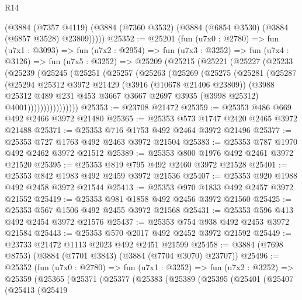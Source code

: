 \begin{lexlean}{R14}
\begin{coremodule}
      (@3884
        (@7357 @4119)
        (@3884 (@7360 @3532) (@3884 (@6854 @3530) (@3884 (@6857 @3528) @23809)))))
@25352 := @25201
    (fun (u7x0 : @2780) =>
    fun (u7x1 : @3093) =>
    fun (u7x2 : @2954) =>
    fun (u7x3 : @3252) =>
    fun (u7x4 : @3126) =>
    fun (u7x5 : @3252) =>
    @25209
      (@25215
        (@25221
          (@25227
            (@25233
              (@25239
                (@25245
                  (@25251
                    (@25257
                      (@25263
                        (@25269
                          (@25275
                            (@25281
                              (@25287
                                (@25294
                                  @25312
                                  @3972
                                  @21429
                                  (@3916 (@10678 @21406 @23809))
                                  (@3988
                                    @25312
                                    @489
                                    @231
                                    @453
                                    @3667
                                    @3667
                                    @2697
                                    @3935
                                    (@3998 @25312)
                                    @4001))))))))))))))))
@25353 := @23708 @21472
@25359 := @25353 @486 @669 @492 @2466 @3972 @21480
@25365 := @25353 @573 @1747 @2420 @2465 @3972 @21488
@25371 := @25353 @716 @1753 @492 @2464 @3972 @21496
@25377 := @25353 @727 @1763 @492 @2463 @3972 @21504
@25383 := @25353 @787 @1970 @492 @2462 @3972 @21512
@25389 := @25353 @800 @1976 @492 @2461 @3972 @21520
@25395 := @25353 @819 @795 @492 @2460 @3972 @21528
@25401 := @25353 @842 @1983 @492 @2459 @3972 @21536
@25407 := @25353 @920 @1988 @492 @2458 @3972 @21544
@25413 := @25353 @970 @1833 @492 @2457 @3972 @21552
@25419 := @25353 @981 @1858 @492 @2456 @3972 @21560
@25425 := @25353 @567 @1506 @492 @2455 @3972 @21568
@25431 := @25353 @596 @413 @492 @2454 @3972 @21576
@25437 := @25353 @754 @938 @492 @2453 @3972 @21584
@25443 := @25353 @570 @2017 @492 @2452 @3972 @21592
@25449 := @23733 @21472 @1113 @2023 @492 @2451 @21599
@25458 := @3884 (@7698 @8753) (@3884 (@7701 @3843) (@3884 (@7704 @3070) @23707))
@25496 := @25352
    (fun (u7x0 : @2780) =>
    fun (u7x1 : @3252) =>
    fun (u7x2 : @3252) =>
    @25359
      (@25365
        (@25371
          (@25377
            (@25383
              (@25389
                (@25395
                  (@25401
                    (@25407
                      (@25413
                        (@25419

\end{coremodule}
\end{lexlean}
